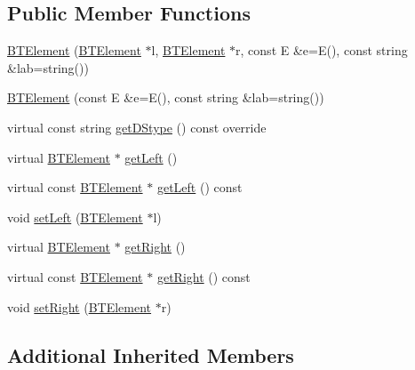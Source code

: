 \subsection*{Public Member Functions}
\begin{DoxyCompactItemize}
\item 
\mbox{\hyperlink{classbridges_1_1_b_t_element_a8abf38e5d2d70c247de6a6fe6b90bf1b}{B\+T\+Element}} (\mbox{\hyperlink{classbridges_1_1_b_t_element}{B\+T\+Element}} $\ast$l, \mbox{\hyperlink{classbridges_1_1_b_t_element}{B\+T\+Element}} $\ast$r, const E \&e=E(), const string \&lab=string())
\item 
\mbox{\hyperlink{classbridges_1_1_b_t_element_afdc1d11d1d65b23007334d337c279c3a}{B\+T\+Element}} (const E \&e=E(), const string \&lab=string())
\item 
virtual const string \mbox{\hyperlink{classbridges_1_1_b_t_element_a43cc18d2c1e71c399782a306b60e4260}{get\+D\+Stype}} () const override
\item 
virtual \mbox{\hyperlink{classbridges_1_1_b_t_element}{B\+T\+Element}} $\ast$ \mbox{\hyperlink{classbridges_1_1_b_t_element_ab5955c2611b6ae8c3c48508e3e983f87}{get\+Left}} ()
\item 
virtual const \mbox{\hyperlink{classbridges_1_1_b_t_element}{B\+T\+Element}} $\ast$ \mbox{\hyperlink{classbridges_1_1_b_t_element_a01ebba851e9cc6ec77df16201604597a}{get\+Left}} () const
\item 
void \mbox{\hyperlink{classbridges_1_1_b_t_element_a86f58ed6311eeb7eddc76188c423781c}{set\+Left}} (\mbox{\hyperlink{classbridges_1_1_b_t_element}{B\+T\+Element}} $\ast$l)
\item 
virtual \mbox{\hyperlink{classbridges_1_1_b_t_element}{B\+T\+Element}} $\ast$ \mbox{\hyperlink{classbridges_1_1_b_t_element_a931de8a71c04479a4aa0885ecee2a855}{get\+Right}} ()
\item 
virtual const \mbox{\hyperlink{classbridges_1_1_b_t_element}{B\+T\+Element}} $\ast$ \mbox{\hyperlink{classbridges_1_1_b_t_element_ad3b12cd9fa6f3f18fb66c07dbc73a409}{get\+Right}} () const
\item 
void \mbox{\hyperlink{classbridges_1_1_b_t_element_a19cf1ad19b8dd33e0539d77ed7f5c7f6}{set\+Right}} (\mbox{\hyperlink{classbridges_1_1_b_t_element}{B\+T\+Element}} $\ast$r)
\end{DoxyCompactItemize}
\subsection*{Additional Inherited Members}


